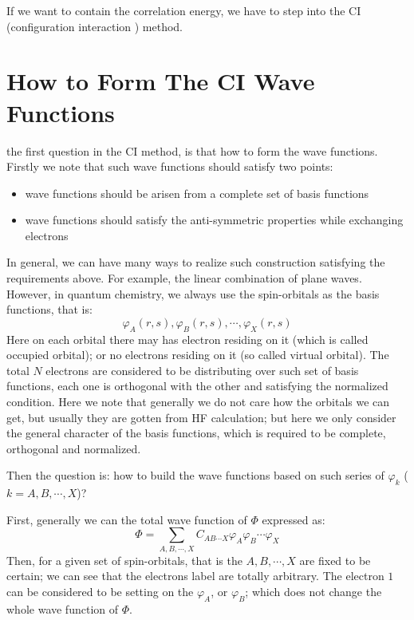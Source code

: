 If we want to contain the correlation energy, we have to step into the
CI (configuration interaction ) method.

\section{How to Form The CI Wave Functions}\label{CI2}
%
%
the first question in the CI method, is that how to form the wave
functions. Firstly we note that such wave functions should satisfy two
points:
\begin{itemize}
\item wave functions should be arisen from a complete set of basis
  functions
\item wave functions should satisfy the anti-symmetric properties
  while exchanging electrons
\end{itemize}

In general, we can have many ways to realize such construction
satisfying the requirements above. For example, the linear combination
of plane waves. However, in quantum chemistry, we always use the
spin-orbitals as the basis functions, that is:
\begin{equation}\label{}
  \varphi_{A}(r,s), \varphi_{B}(r,s), \cdots, \varphi_{X}(r,s)
\end{equation}
Here on each orbital there may has electron residing on it (which is
called occupied orbital); or no electrons residing on it (so called
virtual orbital). The total $N$ electrons are considered to be
distributing over such set of basis functions, each one is orthogonal
with the other and satisfying the normalized condition.  Here we note
that generally we do not care how the orbitals we can get, but usually
they are gotten from HF calculation; but here we only consider the
general character of the basis functions, which is required to be
complete, orthogonal and normalized.

Then the question is: how to build the wave functions based on such
series of $\varphi_{k}$ ($k = A, B, \cdots, X$)?

First, generally we can the total wave function of $\Phi$ expressed
as:
\begin{equation}\label{}
  \Phi = \sum_{A,B, \cdots, X}C_{AB\cdots
    X}\varphi_{A}\varphi_{B}\cdots\varphi_{X}
\end{equation}
Then, for a given set of spin-orbitals, that is the $A, B, \cdots, X$
are fixed to be certain; we can see that the electrons label are
totally arbitrary. The electron $1$ can be considered to be setting on
the $\varphi_{A}$, or $\varphi_{B}$; which does not change the whole
wave function of $\Phi$.

